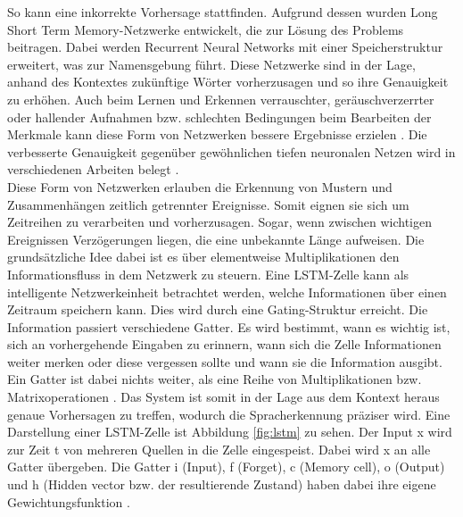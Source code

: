 So kann eine inkorrekte Vorhersage stattfinden. Aufgrund dessen wurden Long Short Term Memory-Netzwerke entwickelt, die zur Lösung des Problems beitragen. Dabei werden Recurrent Neural Networks mit einer Speicherstruktur erweitert, was zur Namensgebung führt. Diese Netzwerke sind in der Lage, anhand des Kontextes zukünftige Wörter vorherzusagen und so ihre Genauigkeit zu erhöhen. Auch beim Lernen und Erkennen verrauschter, geräuschverzerrter oder hallender Aufnahmen bzw. schlechten Bedingungen beim Bearbeiten der Merkmale kann diese Form von Netzwerken bessere Ergebnisse erzielen \cite{Yu.2014}. Die verbesserte Genauigkeit gegenüber gewöhnlichen tiefen neuronalen Netzen wird in verschiedenen Arbeiten belegt \cite{Yu.2014, 2015arXiv150706947S}. 
\\
Diese Form von Netzwerken erlauben die Erkennung von Mustern und Zusammenhängen zeitlich getrennter Ereignisse. Somit eignen sie sich um Zeitreihen zu verarbeiten und vorherzusagen. Sogar, wenn zwischen wichtigen Ereignissen Verzögerungen liegen, die eine unbekannte Länge aufweisen. 
Die grundsätzliche Idee dabei ist es über elementweise Multiplikationen den Informationsfluss in dem Netzwerk zu steuern. Eine LSTM-Zelle kann als intelligente Netzwerkeinheit betrachtet werden, welche Informationen über einen Zeitraum speichern kann. Dies wird durch eine Gating-Struktur erreicht. Die Information passiert verschiedene Gatter. Es wird bestimmt, wann es wichtig ist, sich an vorhergehende Eingaben zu erinnern, wann sich die Zelle Informationen weiter merken oder diese vergessen sollte und wann sie die Information ausgibt. Ein Gatter ist dabei nichts weiter, als eine Reihe von Multiplikationen bzw. Matrixoperationen {\cite{Yu.2014}}. 
Das System ist somit in der Lage aus dem Kontext heraus genaue Vorhersagen zu treffen, wodurch die Spracherkennung präziser wird. Eine Darstellung einer LSTM-Zelle ist Abbildung \ref{fig:lstm} zu sehen. Der Input x wird zur Zeit t von mehreren Quellen in die Zelle eingespeist. Dabei wird x an alle Gatter übergeben. Die Gatter i (Input), f (Forget), c (Memory cell), o (Output) und h (Hidden vector bzw. der resultierende Zustand) haben dabei ihre eigene Gewichtungsfunktion \cite{6638947}.   

